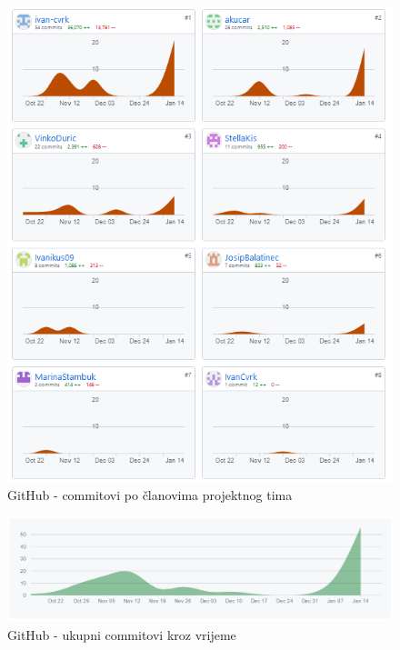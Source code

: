 		
		\begin{figure}[H]
			\includegraphics[width=\textwidth]{slike/github3.PNG}
			\caption{GitHub - commitovi po članovima projektnog tima}
			\label{fig:github1}
		\end{figure}
		
		\begin{figure}[H]
			\includegraphics[width=\textwidth]{slike/github4.PNG}
			\caption{GitHub - ukupni commitovi kroz vrijeme}
			\label{fig:github2}
		\end{figure}
		
	